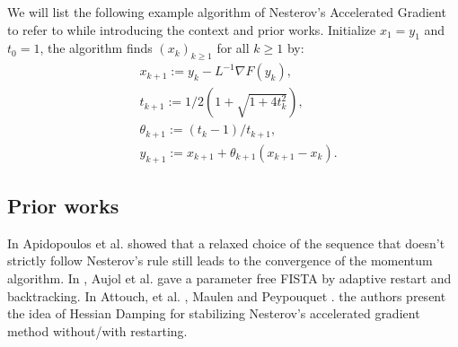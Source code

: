 \documentclass[12pt]{article}
\begin{document}
        We will list the following example algorithm of Nesterov's Accelerated Gradient to refer to while introducing the context and prior works.
        Initialize $x_1 = y_1$ and $t_0 = 1$, the algorithm finds $(x_k)_{k \ge 1}$ for all $k \ge 1$ by:
        \begin{align}
            & x_{k + 1} := y_k - L^{-1}\nabla F(y_k),
            \\
            & t_{k + 1} := 1/2\left(1 + \sqrt{1 + 4t_{k}^2}\right),
            \\
            & \theta_{k + 1} := (t_{k} - 1)/t_{k + 1}, \label{eqn:example-algorithm}
            \\
            & y_{k + 1} := x_{k + 1} + \theta_{k + 1}(x_{k + 1} - x_k).
        \end{align}

        \subsection{Prior works}
            In \cite{apidopoulos_convergence_2018} Apidopoulos et al. showed that a relaxed choice of the sequence that doesn't strictly follow Nesterov's rule 
            still leads to the convergence of the momentum algorithm. In \cite{aujol_parameter-free_2024}, Aujol et al. gave a parameter free FISTA by adaptive restart and backtracking. 
           In Attouch, et al. \cite{attouch_first-order_2022}, Maulen and Peypouquet \cite{maulen_speed_2023}. the authors
            present the idea of Hessian Damping for stabilizing Nesterov's accelerated gradient method without/with restarting.
\end{document}
